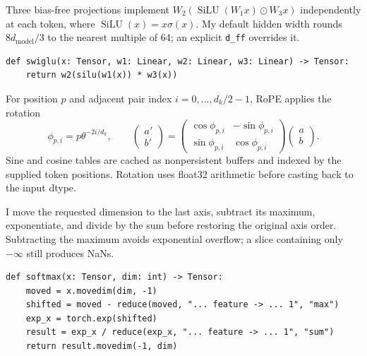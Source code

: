 

Three bias-free projections implement $W_2(\operatorname{SiLU}(W_1x)\odot W_3x)$ independently at each token, where $\operatorname{SiLU}(x)=x\sigma(x)$. My default hidden width rounds $8d_{\mathrm{model}}/3$ to the nearest multiple of 64; an explicit \texttt{d\_ff} overrides it.
\par\noindent
\begin{minipage}{\linewidth}
\begin{lstlisting}[caption={SwiGLU computation}]
def swiglu(x: Tensor, w1: Linear, w2: Linear, w3: Linear) -> Tensor:
    return w2(silu(w1(x)) * w3(x))
\end{lstlisting}
\end{minipage}\par




For position $p$ and adjacent pair index
$i=0,\ldots,d_k/2-1$, RoPE applies the rotation
\[
\phi_{p,i}=p\theta^{-2i/d_k},\qquad
\begin{pmatrix}a'\\b'\end{pmatrix}
=\begin{pmatrix}
\cos\phi_{p,i}&-\sin\phi_{p,i}\\
\sin\phi_{p,i}&\cos\phi_{p,i}
\end{pmatrix}
\begin{pmatrix}a\\b\end{pmatrix}.
\]
Sine and cosine tables are cached as nonpersistent buffers and indexed by
the supplied token positions. Rotation uses float32 arithmetic before
casting back to the input dtype.




I move the requested dimension to the last axis, subtract its maximum, exponentiate, and divide by the sum before restoring the original axis order. Subtracting the maximum avoids exponential overflow; a slice containing only $-\infty$ still produces NaNs.
\par\noindent
\begin{minipage}{\linewidth}
\begin{lstlisting}[caption={Softmax computation}]
def softmax(x: Tensor, dim: int) -> Tensor:
    moved = x.movedim(dim, -1)
    shifted = moved - reduce(moved, "... feature -> ... 1", "max")
    exp_x = torch.exp(shifted)
    result = exp_x / reduce(exp_x, "... feature -> ... 1", "sum")
    return result.movedim(-1, dim)
\end{lstlisting}
\end{minipage}\par

